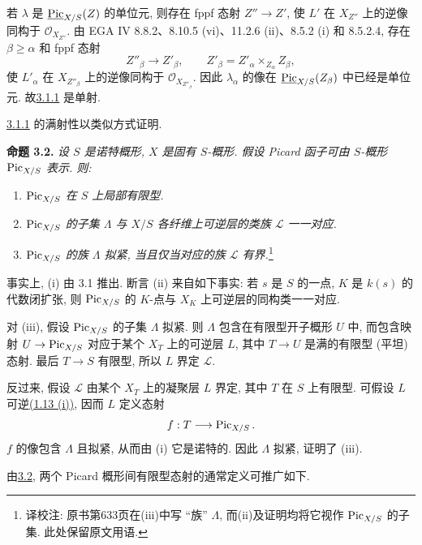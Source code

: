 若 \(\lambda\) 是 \(\underline{\operatorname{Pic}}_{X/S}(Z)\) 的单位元, 则存在 fppf 态射 \(Z''\to Z'\), 使 \(L'\) 在 \(X_{Z''}\) 上的逆像同构于 \(\mathcal O_{X_{Z''}}\). 由 EGA IV 8.8.2、8.10.5 (vi)、11.2.6 (ii)、8.5.2 (i) 和 8.5.2.4, 存在 \(\beta\ge\alpha\) 和 fppf 态射
\[
Z''_\beta\longrightarrow Z'_\beta,
\qquad
Z'_\beta=Z'_\alpha\times_{Z_\alpha}Z_\beta,
\]
使 \(L'_\alpha\) 在 \(X_{Z''_\beta}\) 上的逆像同构于 \(\mathcal O_{X_{Z''_\beta}}\). 因此 \(\lambda_\alpha\) 的像在 \(\underline{\operatorname{Pic}}_{X/S}(Z_\beta)\) 中已经是单位元. 故\hyperlink{sga6.e13.eq.3-1-1}{3.1.1} 是单射.

\hyperlink{sga6.e13.eq.3-1-1}{3.1.1} 的满射性以类似方式证明.

\textbf{命题 3.2.} \emph{设 \(S\) 是诺特概形, \(X\) 是固有 \(S\)-概形. 假设 Picard 函子可由 \(S\)-概形 \(\operatorname{Pic}_{X/S}\) 表示. 则:}
\begin{enumerate}[label=(\roman*)]
\item \emph{\(\operatorname{Pic}_{X/S}\) 在 \(S\) 上局部有限型.}
\item \emph{\(\operatorname{Pic}_{X/S}\) 的子集 \(\Lambda\) 与 \(X/S\) 各纤维上可逆层的类族 \(\mathscr L\) 一一对应.}
\item \emph{\(\operatorname{Pic}_{X/S}\) 的族 \(\Lambda\) 拟紧, 当且仅当对应的族 \(\mathscr L\) 有界.}\footnote{译校注: 原书第633页在(iii)中写 ``族'' $\Lambda$, 而(ii)及证明均将它视作 $\operatorname{Pic}_{X/S}$ 的子集. 此处保留原文用语.}
\end{enumerate}


事实上, (i) 由 3.1 推出. 断言 (ii) 来自如下事实: 若 \(s\) 是 \(S\) 的一点, \(K\) 是 \(k(s)\) 的代数闭扩张, 则 \(\operatorname{Pic}_{X/S}\) 的 \(K\)-点与 \(X_K\) 上可逆层的同构类一一对应.

对 (iii), 假设 \(\operatorname{Pic}_{X/S}\) 的子集 \(\Lambda\) 拟紧. 则 \(\Lambda\) 包含在有限型开子概形 \(U\) 中, 而包含映射 \(U\to\operatorname{Pic}_{X/S}\) 对应于某个 \(X_T\) 上的可逆层 \(L\), 其中 \(T\to U\) 是满的有限型 (平坦) 态射. 最后 \(T\to S\) 有限型, 所以 \(L\) 界定 \(\mathscr L\).

反过来, 假设 \(\mathscr L\) 由某个 \(X_T\) 上的凝聚层 \(L\) 界定, 其中 \(T\) 在 \(S\) 上有限型. 可假设 \(L\) 可逆\hyperlink{sga6.e13.thm.1-13}{(1.13 (i))}, 因而 \(L\) 定义态射
\[
f:T\longrightarrow\operatorname{Pic}_{X/S}.
\]
\(f\) 的像包含 \(\Lambda\) 且拟紧, 从而由 (i) 它是诺特的. 因此 \(\Lambda\) 拟紧, 证明了 (iii).

由\hyperlink{sga6.e13.prop.3-2}{3.2}, 两个 Picard 概形间有限型态射的通常定义可推广如下.

